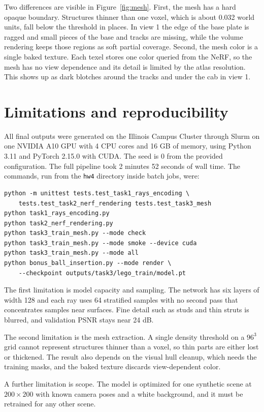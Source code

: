 \documentclass[11pt]{article}
\begin{document}
Two differences are visible in Figure~\ref{fig:mesh}. First, the mesh has a hard opaque boundary. Structures thinner than one voxel, which is about 0.032 world units, fall below the threshold in places. In view 1 the edge of the base plate is ragged and small pieces of the base and tracks are missing, while the volume rendering keeps those regions as soft partial coverage. Second, the mesh color is a single baked texture. Each texel stores one color queried from the NeRF, so the mesh has no view dependence and its detail is limited by the atlas resolution. This shows up as dark blotches around the tracks and under the cab in view 1.

\section{Limitations and reproducibility}

All final outputs were generated on the Illinois Campus Cluster through Slurm on one NVIDIA A10 GPU with 4 CPU cores and 16 GB of memory, using Python 3.11 and PyTorch 2.15.0 with CUDA. The seed is 0 from the provided configuration. The full pipeline took 2 minutes 52 seconds of wall time. The commands, run from the \texttt{hw4} directory inside batch jobs, were:

{\small
\begin{verbatim}
python -m unittest tests.test_task1_rays_encoding \
    tests.test_task2_nerf_rendering tests.test_task3_mesh
python task1_rays_encoding.py
python task2_nerf_rendering.py
python task3_train_mesh.py --mode check
python task3_train_mesh.py --mode smoke --device cuda
python task3_train_mesh.py --mode all
python bonus_ball_insertion.py --mode render \
    --checkpoint outputs/task3/lego_train/model.pt
\end{verbatim}
}

The first limitation is model capacity and sampling. The network has six layers of width 128 and each ray uses 64 stratified samples with no second pass that concentrates samples near surfaces. Fine detail such as studs and thin struts is blurred, and validation PSNR stays near 24 dB.

The second limitation is the mesh extraction. A single density threshold on a $96^3$ grid cannot represent structures thinner than a voxel, so thin parts are either lost or thickened. The result also depends on the visual hull cleanup, which needs the training masks, and the baked texture discards view-dependent color.

A further limitation is scope. The model is optimized for one synthetic scene at $200 \times 200$ with known camera poses and a white background, and it must be retrained for any other scene.
\end{document}
